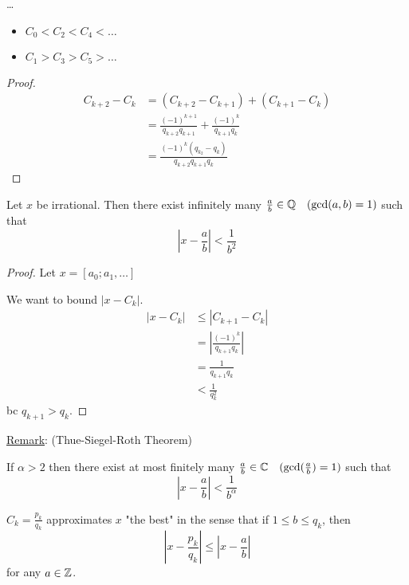     \begin{theorem}
        \dots
        \begin{itemize}
            \item $C_0 < C_2 < C_4 < \dots$
            \item $C_1 > C_3 > C_5 > \dots$
        \end{itemize}
        \begin{proof}
            \begin{align*}
                C_{k+2} - C_k &= (C_{k+2} - C_{k+1}) + (C_{k+1} - C_k) \\
                &= \frac{(-1)^{k+1}}{q_{k+2}q_{k+1}} + \frac{(-1)^k}{q_{k+1}q_k} \\
                &= \frac{(-1)^k(q_{k_2} - q_k)}{q_{k+2}q_{k+1}q_k}
            \end{align*} 
        \end{proof}
    \end{theorem}

    \begin{theorem} 
        Let $x$ be irrational. 
        Then there exist infinitely many $\frac{a}{b}\in\mathbb{Q} \quad(\gcd(a,b)=1)$
        such that 
        \[
            |x-\frac{a}{b}| < \frac{1}{b^2}
        \]
        \begin{proof}
            Let $x=[a_0; a_1, \dots]$

            We want to bound $|x-C_k|$.
            \begin{align*}
                |x-C_k| &\le |C_{k+1} - C_k| \\
                &= |\frac{(-1)^k}{q_{k+1}q_k}| \\
                &= \frac{1}{q_{k+1}q_k} \\
                &< \frac{1}{q_k^2}
            \end{align*}
            bc $q_{k+1} > q_k$.
        \end{proof}
    \end{theorem}

    \underline{Remark}: (Thue-Siegel-Roth Theorem)

    If $\alpha > 2$ then there exist at most finitely many $\frac{a}{b}\in\mathbb{C}\quad(\gcd(\frac{a}{b}) = 1)$
    such that 
    \[
        |x-\frac{a}{b}| < \frac{1}{b^\alpha}
    \]

    \begin{theorem}
        $C_k = \frac{p_k}{q_k}$ approximates $x$ "the best" in the sense that 
        if $1\le b\le q_k$, then 
        \[
            |x-\frac{p_k}{q_k}| \le |x - \frac{a}{b}|
        \]
        for any $a\in\mathbb{Z}$. 
    \end{theorem}

